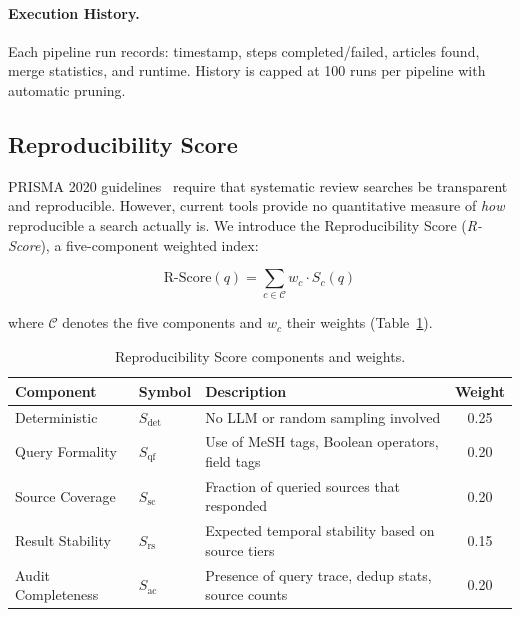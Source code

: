 \documentclass[11pt,a4paper]{article}
\newcommand{\rscore}{\textit{R-Score}}
\begin{document}
\paragraph{Execution History.}
Each pipeline run records: timestamp, steps completed/failed, articles found, merge statistics, and runtime.
History is capped at 100 runs per pipeline with automatic pruning.

\subsection{Reproducibility Score}
\label{sec:reproducibility}

PRISMA 2020 guidelines~\citep{page2021prisma} require that systematic review searches be transparent and reproducible.
However, current tools provide no quantitative measure of \emph{how} reproducible a search actually is.
We introduce the Reproducibility Score (\rscore{}), a five-component weighted index:

\begin{equation}
\text{R-Score}(q) = \sum_{c \in \mathcal{C}} w_c \cdot S_c(q)
\label{eq:rscore}
\end{equation}

where $\mathcal{C}$ denotes the five components and $w_c$ their weights (Table~\ref{tab:rscore_components}).

\begin{table}[htbp]
\centering
\caption{Reproducibility Score components and weights.}
\label{tab:rscore_components}
\begin{tabular}{llp{5.5cm}c}
\toprule
\textbf{Component} & \textbf{Symbol} & \textbf{Description} & \textbf{Weight} \\
\midrule
Deterministic      & $S_{\text{det}}$   & No LLM or random sampling involved & 0.25 \\
Query Formality    & $S_{\text{qf}}$    & Use of MeSH tags, Boolean operators, field tags & 0.20 \\
Source Coverage     & $S_{\text{sc}}$    & Fraction of queried sources that responded & 0.20 \\
Result Stability   & $S_{\text{rs}}$    & Expected temporal stability based on source tiers & 0.15 \\
Audit Completeness & $S_{\text{ac}}$    & Presence of query trace, dedup stats, source counts & 0.20 \\
\bottomrule
\end{tabular}
\end{table}
\end{document}
